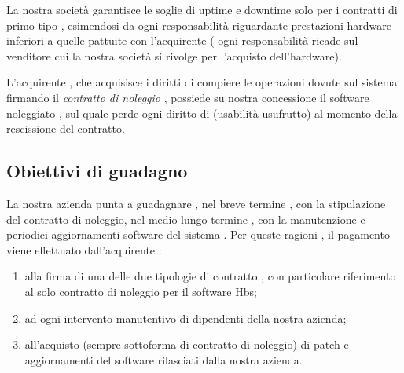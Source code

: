 La nostra società garantisce le soglie di uptime e downtime solo per i contratti di primo tipo , esimendosi da ogni responsabilità riguardante prestazioni hardware inferiori a quelle pattuite con l'acquirente ( ogni responsabilità ricade sul venditore cui la nostra società si rivolge per l'acquisto dell'hardware).

L'acquirente , che acquisisce i diritti di compiere le operazioni dovute sul sistema firmando il \emph{contratto di noleggio} , possiede su nostra concessione il software noleggiato , sul quale perde ogni diritto di (usabilità-usufrutto) al momento della rescissione del contratto.



\subsection{Obiettivi di guadagno}
La nostra azienda punta a guadagnare , nel breve termine , con la stipulazione del contratto di noleggio,  nel medio-lungo termine , con la manutenzione e periodici aggiornamenti software del sistema . 
Per queste ragioni , il pagamento viene effettuato dall'acquirente :
\begin{enumerate}
\item alla firma di una delle due tipologie di contratto , con particolare riferimento al solo contratto di noleggio per il software Hbs;
\item ad ogni intervento manutentivo di dipendenti della nostra azienda;
\item all'acquisto (sempre sottoforma di contratto di noleggio) di patch e aggiornamenti del software rilasciati dalla nostra azienda.
\end{enumerate}

